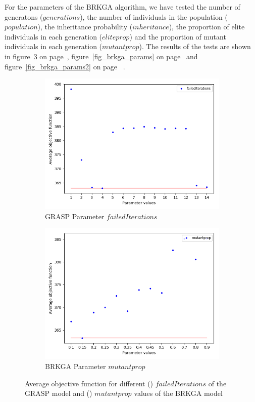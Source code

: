 For the parameters of the BRKGA algorithm, we have tested the number of generatons ($generations$), the number of individuals in the population ($population$), the inheritance probability ($inheritance$), the proportion of elite individuals in each generation ($eliteprop$) and the proportion of mutant individuals in each generation ($mutantprop$). The results of the tests are shown in figure~\ref{fig_grasp_brkga_params} on page~\pageref{fig_grasp_brkga_params}, figure~\ref{fig_brkga_params} on page~\pageref{fig_brkga_params} and  figure~\ref{fig_brkga_params2} on page~\pageref{fig_brkga_params2} .\\


\begin{figure}[h!]
\begin{subfigure}[b]{.49\linewidth}
\centering
\includegraphics[width=0.8\linewidth]{./img/best-lsiteration.png}
\caption{GRASP Parameter $failedIterations$ }\label{fig1c}
\end{subfigure}
\begin{subfigure}[b]{.49\linewidth}
\centering
\includegraphics[width=0.8\linewidth]{./img/best-mutantprop.png}
\caption{BRKGA Parameter $mutantprop$ }\label{fig2e}
\end{subfigure}\vfill
\caption{Average objective function for different () $failedIterations$ of the GRASP model and () $mutantprop$ values of the BRKGA model}
\label{fig_grasp_brkga_params}
\end{figure}




